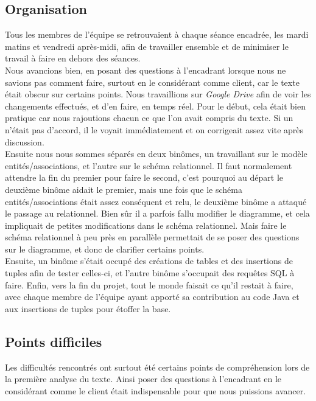 \documentclass[10pt]{article}
\begin{document}
\subsection{Organisation}

Tous les membres de l'équipe se retrouvaient à chaque séance encadrée, les mardi matins et vendredi après-midi, afin de travailler 
ensemble et de minimiser le travail à faire en dehors des séances.\\

Nous avancions bien, en posant des questions à l'encadrant lorsque nous ne savions pas comment faire, surtout en le considérant comme
client, car le texte était obscur sur certains points. 
Nous travaillions sur \emph{Google Drive} afin de voir les changements effectués, et d'en faire, en temps réel. Pour le début, cela était
bien pratique car nous rajoutions chacun ce que l'on avait compris du texte. Si un n'était pas d'accord, il le voyait immédiatement et
on corrigeait assez vite après discussion. \\

Ensuite nous nous sommes séparés en deux binômes, un travaillant sur le modèle entités/associations, et l'autre sur le schéma relationnel.
Il faut normalement attendre la fin du premier pour faire le second, c'est pourquoi au départ le deuxième binôme aidait le premier, mais
une fois que le schéma entités/associations était assez conséquent et relu, le deuxième binôme a attaqué le passage au relationnel.
Bien sûr il a parfois fallu modifier le diagramme, et cela impliquait de petites modifications dans le schéma relationnel. Mais faire
le schéma relationnel à peu près en parallèle permettait de se poser des questions sur le diagramme, et donc de clarifier certains
points.\\

Ensuite, un binôme s'était occupé des créations de tables et des insertions de tuples afin de tester celles-ci, et l'autre binôme 
s'occupait des requêtes SQL à faire. Enfin, vers la fin du projet, tout le monde faisait ce qu'il restait à faire, avec chaque membre
de l'équipe ayant apporté sa contribution au code Java et aux insertions de tuples pour étoffer la base.

\subsection{Points difficiles}

Les difficultés rencontrés ont surtout été certains points de compréhension lors de la première analyse du texte. Ainsi poser des questions
à l'encadrant en le considérant comme le client était indispensable pour que nous puissions avancer. \\
\end{document}
